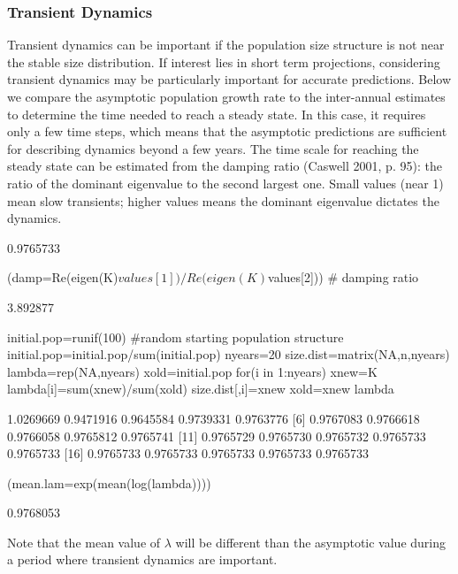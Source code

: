 \documentclass[11pt]{article}
\begin{document}
\subsubsection{Transient Dynamics}
\label{sec:Transient Dynamics}
Transient dynamics can be important if the population size structure is not near the stable size distribution. If interest lies in short term projections, considering transient dynamics may be particularly important for accurate predictions. Below we compare the asymptotic population growth rate to the inter-annual estimates to determine the time needed to reach a steady state. In this case, it requires only a few time steps, which means that the asymptotic predictions are sufficient for describing dynamics beyond a few years. The time scale for reaching the steady state can be estimated from the damping ratio (Caswell 2001, p. 95): the ratio of the dominant eigenvalue to the second largest one. Small values (near 1) mean slow transients; higher values means the dominant eigenvalue dictates the dynamics.

\begin{Schunk}
\begin{Soutput}
[1] 0.9765733
\end{Soutput}
\begin{Sinput}
 (damp=Re(eigen(K)$values[1])/Re(eigen(K)$values[2])) # damping ratio
\end{Sinput}
\begin{Soutput}
[1] 3.892877
\end{Soutput}
\begin{Sinput}
 initial.pop=runif(100)  #random starting population structure
 initial.pop=initial.pop/sum(initial.pop)
 nyears=20
 size.dist=matrix(NA,n,nyears)
 lambda=rep(NA,nyears)
 xold=initial.pop
 for(i in 1:nyears){
  	xnew=K%
    lambda[i]=sum(xnew)/sum(xold)
  	size.dist[,i]=xnew
    xold=xnew
  }
 lambda
\end{Sinput}
\begin{Soutput}
 [1] 1.0269669 0.9471916 0.9645584 0.9739331 0.9763776
 [6] 0.9767083 0.9766618 0.9766058 0.9765812 0.9765741
[11] 0.9765729 0.9765730 0.9765732 0.9765733 0.9765733
[16] 0.9765733 0.9765733 0.9765733 0.9765733 0.9765733
\end{Soutput}
\begin{Sinput}
 (mean.lam=exp(mean(log(lambda))))
\end{Sinput}
\begin{Soutput}
[1] 0.9768053
\end{Soutput}
\begin{Sinput}
 
\end{Sinput}
\end{Schunk}
Note that the mean value of $\lambda$ will be different than the asymptotic value during a period where transient dynamics are important. 
\end{document}
